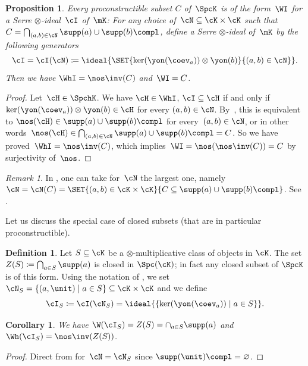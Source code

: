 \documentclass[11pt]{amsart}
\numberwithin{equation}{section} %
\theoremstyle{plain}
\newtheorem{prop}[equation]{Proposition}
\newtheorem{cor}[equation]{Corollary}
\theoremstyle{definition}
\newtheorem{dfn}[equation]{Definition}
\theoremstyle{remark}
\newtheorem{rem}[equation]{Remark}
\begin{document}
%
\begin{prop}
\label{prop:procon-Spc(AI)}%
Every proconstructible subset $C$ of~$\SpcK$ is of the form~$\WI$ for a Serre $\otimes$-ideal~$\cI$ of~$\mK$: For any choice of~$\cN\subseteq \cK\times \cK$ such that $C=\bigcap_{(a,b)\in \cN}\supp(a)\cup\supp(b)\compl$, define a Serre $\otimes$-ideal of~$\mK$ by the following generators
%
\begin{equation*}
\cI =\cI(\cN)\coloneq \ideal{ \SET{ \ker(\yon(\coev_a))\otimes \yon(b)  }{ (a,b) \in \cN}}.
\end{equation*}
%
Then we have $\WhI=\nos\inv(C)$ and~$\WI=C$.
\end{prop}
%
\begin{proof}
Let~$\cH\in\SpchK$. We have $\cH\in\WhI$, \ie $\cI \subseteq \cH$ if and only if $\ker(\yon(\coev_a)) \otimes \yon(b) \in \cH$ for every $(a, b) \in \cN$. By~, this is equivalent to $\nos(\cH)\in\supp(a)\cup \supp(b)\compl$ for every~$(a,b)\in\cN$, or in other words~$\nos(\cH)\in \bigcap_{(a,b)\in \cN}\supp(a)\cup\supp(b)\compl=C$.
So we have proved~$\WhI=\nos\inv(C)$, which implies~$\WI=\nos(\nos\inv(C))=C$ by surjectivity of~$\nos$.
\end{proof}
%
\begin{rem}
In , one can take for~$\cN$ the largest one, namely $\cN=\cN(C) = \SET{ (a, b) \in \cK \times \cK }{ C \subseteq \supp(a)\cup \supp(b)\compl}$. See .
\end{rem}

Let us discuss the special case of closed subsets (that are in particular proconstructible).

\begin{dfn}
\label{dfn:I_S}%
Let $S\subseteq \cK$ be a $\otimes$-multiplicative class of objects in $\cK$. The set $Z(S) \coloneq \bigcap_{a \in S} \supp(a)$ is closed in $\Spc(\cK)$; in fact any closed subset of $\SpcK$ is of this form. Using the notation of , we set $\cN_S = \{(a, \unit) \mid a \in S \} \subseteq \cK \times \cK$ and we define
    \begin{equation*}
        \cI_S \coloneq \cI(\cN_S) = \ideal{ \{  \ker(\yon(\coev_a)) \mid a \in S\}}.
    \end{equation*}
\end{dfn}
%
\begin{cor}
\label{cor:I_S}%
We have $\W(\cI_S) = Z(S)=\cap_{a\in S}\supp(a)$ and~$\Wh(\cI_S)=\nos\inv(Z(S))$.
\end{cor}
\begin{proof}
Direct from  for~$\cN=\cN_S$ since $\supp(\unit)\compl=\varnothing$.
\end{proof}
\end{document}
